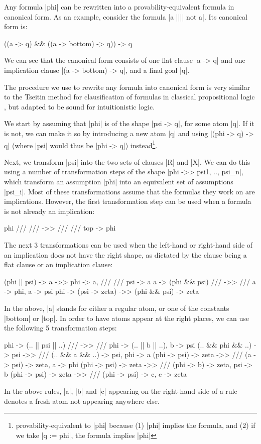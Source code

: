 \documentclass{llncs}
\begin{document}
Any formula |phi| can be rewritten into a provability-equivalent formula in canonical form. As an example, consider the formula
|a |||| not a|. Its canonical form is:
\begin{code}
((a -> q) && ((a -> bottom) -> q)) -> q
\end{code}
We can see that the canonical form consists of one flat clause |a -> q| and one implication clause |(a -> bottom) -> q|, and a final goal |q|.

The procedure we use to rewrite any formula into canonical form is very similar to the Tseitin method for clausification of formulas in classical propositional logic \cite{tseitin}, but adapted to be sound for intuitionistic logic.

We start by assuming that |phi| is of the shape |psi -> q|, for some atom |q|. If it is not, we can make it so by introducing a new atom |q| and using |(phi -> q) -> q| (where |psi| would thus be |phi -> q|) instead\footnote{provability-equivalent to |phi| because (1) |phi| implies the formula, and (2) if we take |q := phi|, the formula implies |phi|}.

Next, we transform |psi| into the two sets of clauses |R| and |X|. We can
do this using a number of transformation steps of the shape |phi ->> psi1, .., psi_n|, which transform an assumption |phi|
into an equivalent set of assumptions |psi_i|. Most of these transformations assume that the formulas they work on are implications. However, the first transformation step can be used
when a formula is not already an implication:
\begin{code}
                   phi /// /// ->> /// /// top -> phi
\end{code}
The next 3 transformations can be used when the left-hand or right-hand side of
an implication does not have the right shape, as dictated by the clause being a flat clause or an implication clause:
\begin{code}
(phi ||  psi)  ->  a                   ->>      phi -> a, /// ///  psi -> a
         a     ->  (phi && psi)   ///  ->> ///  a -> phi,          a -> psi
         phi   ->  (psi -> zeta)       ->>      (phi && psi) -> zeta
\end{code}
In the above, |a| stands for either a regular atom, or one of
the constants |bottom| or |top|. In order to have atoms appear at the right places, we can use the following 5 transformation steps:
\begin{code}
                  phi   ->  (.. || psi || ..)  ///  ->> /// phi  -> (.. || b || ..),   b -> psi
(.. &&  phi   &&  ..)   ->  psi                     ->> /// (.. &&  a &&  ..) -> psi,  phi -> a
        (phi  ->  psi)  ->  zeta                    ->> /// (a    ->  psi)  -> zeta,   a -> phi
        (phi  ->  psi)  ->  zeta                    ->> /// (phi  ->  b)    -> zeta,   psi -> b
        (phi  ->  psi)  ->  zeta                    ->> /// (phi  ->  psi)  -> c,      c -> zeta
\end{code}
In the above rules, |a|, |b| and |c| appearing on the right-hand side of a rule denotes a fresh atom not appearing anywhere else.
\end{document}
